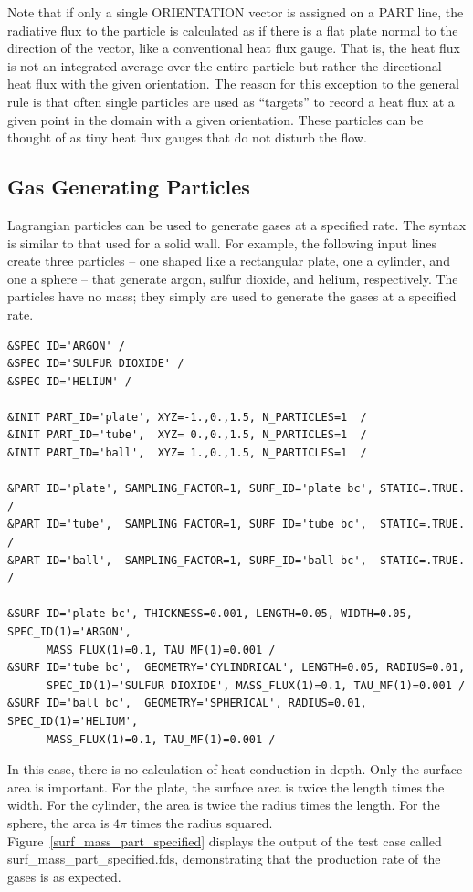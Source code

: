 \documentclass[11pt]{book}
\begin{document}
Note that if only a single {\ct ORIENTATION} vector is assigned on a {\ct PART} line, the radiative flux to the particle is calculated as if there is a flat plate normal to the direction of the vector, like a conventional heat flux gauge. That is, the heat flux is not an integrated average over the entire particle but rather the directional heat flux with the given orientation. The reason for this exception to the general rule is that often single particles are used as ``targets'' to record a heat flux at a given point in the domain with a given orientation. These particles can be thought of as tiny heat flux gauges that do not disturb the flow.

\subsection{Gas Generating Particles}
\label{info:particle_mass_generation}

Lagrangian particles can be used to generate gases at a specified rate. The syntax is similar to that used for a solid wall. For example, the following input lines create three particles -- one shaped like a rectangular plate, one a cylinder, and one a sphere -- that generate argon, sulfur dioxide, and helium, respectively. The particles have no mass; they simply are used to generate the gases at a specified rate.
\begin{lstlisting}
&SPEC ID='ARGON' /
&SPEC ID='SULFUR DIOXIDE' /
&SPEC ID='HELIUM' /

&INIT PART_ID='plate', XYZ=-1.,0.,1.5, N_PARTICLES=1  /
&INIT PART_ID='tube',  XYZ= 0.,0.,1.5, N_PARTICLES=1  /
&INIT PART_ID='ball',  XYZ= 1.,0.,1.5, N_PARTICLES=1  /

&PART ID='plate', SAMPLING_FACTOR=1, SURF_ID='plate bc', STATIC=.TRUE. /
&PART ID='tube',  SAMPLING_FACTOR=1, SURF_ID='tube bc',  STATIC=.TRUE. /
&PART ID='ball',  SAMPLING_FACTOR=1, SURF_ID='ball bc',  STATIC=.TRUE. /

&SURF ID='plate bc', THICKNESS=0.001, LENGTH=0.05, WIDTH=0.05, SPEC_ID(1)='ARGON',
      MASS_FLUX(1)=0.1, TAU_MF(1)=0.001 /
&SURF ID='tube bc',  GEOMETRY='CYLINDRICAL', LENGTH=0.05, RADIUS=0.01,
      SPEC_ID(1)='SULFUR DIOXIDE', MASS_FLUX(1)=0.1, TAU_MF(1)=0.001 /
&SURF ID='ball bc',  GEOMETRY='SPHERICAL', RADIUS=0.01, SPEC_ID(1)='HELIUM',
      MASS_FLUX(1)=0.1, TAU_MF(1)=0.001 /
\end{lstlisting}
In this case, there is no calculation of heat conduction in depth. Only the surface area is important. For the plate, the surface area is twice the length times the width. For the cylinder, the area is twice the radius times the length. For the sphere, the area is $4\pi$ times the radius squared. Figure~\ref{surf_mass_part_specified} displays the output of the test case called {\ct surf\_mass\_part\_specified.fds}, demonstrating that the production rate of the gases is as expected.
\end{document}
